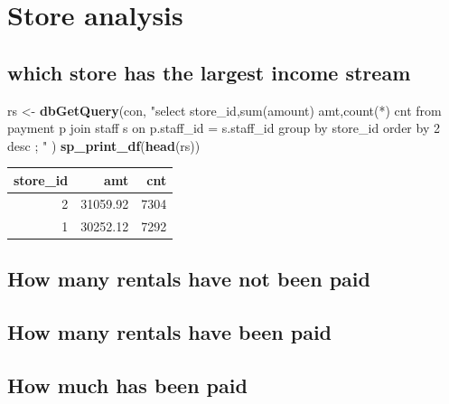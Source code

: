 \documentclass[]{book}
\newenvironment{Shaded}{\begin{snugshade}}{\end{snugshade}}
\newcommand{\KeywordTok}[1]{\textcolor[rgb]{0.13,0.29,0.53}{\textbf{#1}}}
\newcommand{\NormalTok}[1]{#1}
\newcommand{\StringTok}[1]{\textcolor[rgb]{0.31,0.60,0.02}{#1}}
\theoremstyle{definition}
\theoremstyle{definition}
\theoremstyle{definition}
\theoremstyle{remark}
\begin{document}
\hypertarget{store-analysis}{%
\section{Store analysis}\label{store-analysis}}

\hypertarget{which-store-has-the-largest-income-stream}{%
\subsection{which store has the largest income
stream}\label{which-store-has-the-largest-income-stream}}

\begin{Shaded}
\begin{Highlighting}[]
\NormalTok{rs <-}\StringTok{ }\KeywordTok{dbGetQuery}\NormalTok{(con,}
                \StringTok{"select store_id,sum(amount) amt,count(*) cnt }
\StringTok{                   from payment p }
\StringTok{                        join staff s }
\StringTok{                          on p.staff_id = s.staff_id  }
\StringTok{                 group by store_id order by 2 desc}
\StringTok{                 ;}
\StringTok{                "}
\NormalTok{                )}
\KeywordTok{sp_print_df}\NormalTok{(}\KeywordTok{head}\NormalTok{(rs))}
\end{Highlighting}
\end{Shaded}

\begin{tabular}{r|r|r}
\hline
store\_id & amt & cnt\\
\hline
2 & 31059.92 & 7304\\
\hline
1 & 30252.12 & 7292\\
\hline
\end{tabular}

\hypertarget{how-many-rentals-have-not-been-paid}{%
\subsection{How many rentals have not been
paid}\label{how-many-rentals-have-not-been-paid}}

\hypertarget{how-many-rentals-have-been-paid}{%
\subsection{How many rentals have been
paid}\label{how-many-rentals-have-been-paid}}

\hypertarget{how-much-has-been-paid}{%
\subsection{How much has been paid}\label{how-much-has-been-paid}}
\end{document}
